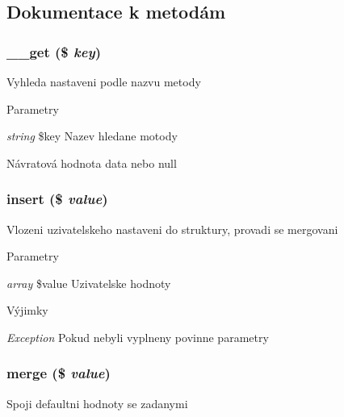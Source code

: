 \subsection{Dokumentace k metodám}
\subsubsection[{\_\-\_\-get}]{\setlength{\rightskip}{0pt plus 5cm}\_\-\_\-get (\$ {\em key})}\label{d7/df8/classcallback__struct_a4537dad3b44254124991341cc91b28fb}
Vyhleda nastaveni podle nazvu metody


\begin{DoxyParams}{Parametry}
\item[{\em string}]\$key Nazev hledane motody \end{DoxyParams}
\begin{DoxyReturn}{Návratová hodnota}
data nebo null 
\end{DoxyReturn}
\subsubsection[{insert}]{\setlength{\rightskip}{0pt plus 5cm}insert (\$ {\em value})}\label{d7/df8/classcallback__struct_a62cf320fe353f6eb1297d7d9ad7ea0fd}
Vlozeni uzivatelskeho nastaveni do struktury, provadi se mergovani 
\begin{DoxyParams}{Parametry}
\item[{\em array}]\$value Uzivatelske hodnoty \end{DoxyParams}

\begin{DoxyExceptions}{Výjimky}
\item[{\em Exception}]Pokud nebyli vyplneny povinne parametry \end{DoxyExceptions}
\subsubsection[{merge}]{\setlength{\rightskip}{0pt plus 5cm}merge (\$ {\em value})\hspace{0.3cm}{\ttfamily  [private]}}\label{d7/df8/classcallback__struct_abf502a7547e415ed6bb157070d60e5b5}
Spoji defaultni hodnoty se zadanymi


